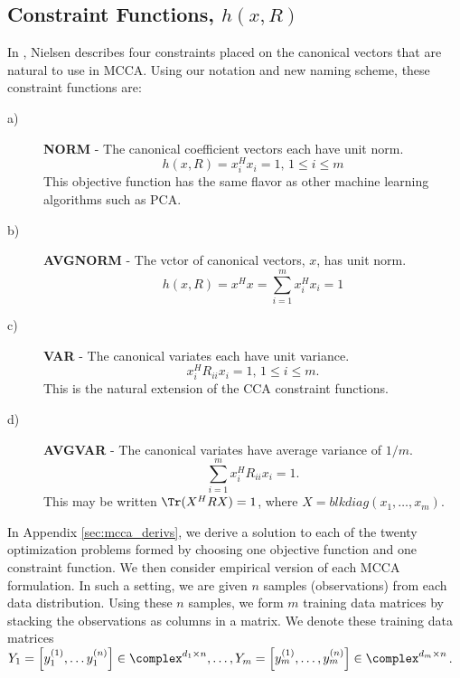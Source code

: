 \subsection{Constraint Functions, $h(x,R)$}\label{sec:constraints}
In \cite{nielsen2002multiset,nielsen1994analysis}, Nielsen describes four constraints
placed on the canonical vectors that are natural to use in MCCA. Using our notation and
new naming scheme, these constraint functions are:

\begin{description}
\item[a)] \textbf{NORM} - The canonical coefficient vectors each have unit norm.
  \begin{equation*}
    h(x,R) = x_i^Hx_i=1,\, 1\leq i\leq m
  \end{equation*}
  This objective function has the same flavor as other machine learning algorithms such as
  PCA.

\item[b)] \textbf{AVGNORM} - The vctor of canonical vectors, $x$, has unit norm.
  \begin{equation*}
    h(x,R) = x^Hx=\sum_{i=1}^mx_i^Hx_i = 1
  \end{equation*}

\item[c)] \textbf{VAR} - The canonical variates each have unit variance.
  \begin{equation*}
    x_i^HR_{ii}x_i = 1,\, 1\leq i\leq m.
  \end{equation*}
  This is the natural extension of the CCA constraint functions. 

\item[d)] \textbf{AVGVAR} - The canonical variates have average variance of $1/m$. 
  \begin{equation*}
    \sum_{i=1}^mx_i^HR_{ii}x_i =1.
  \end{equation*}
  This may be written $\Tr(X^H RX ) = 1$, where $X = blkdiag(x_1,\dots,x_m)$. 
\end{description}

In Appendix \ref{sec:mcca_derivs}, we derive a solution to each of the twenty optimization
problems formed by choosing one objective function and one constraint function. We then
consider empirical version of each MCCA formulation. In such a setting, we are given $n$
samples (observations) from each data distribution. Using these $n$ samples, we form $m$
 training data matrices by stacking the observations as columns in a
matrix. We denote these training data matrices $Y_1=\left[y_1^{(1)},\dots
  y_1^{(n)}\right]\in\complex^{d_1\times n},\dots, Y_m=\left[y_m^{(1)},\dots,
  y_m^{(n)}\right]\in\complex^{d_m\times n}$. 

